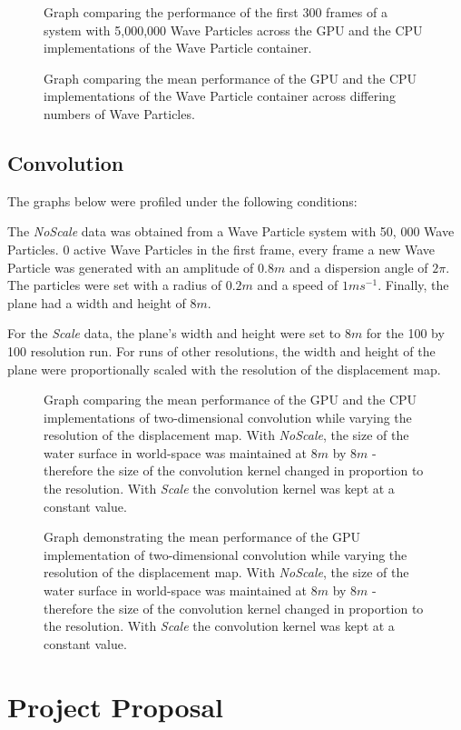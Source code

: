\documentclass[12pt,a4paper,twoside]{report}
\begin{document}
\begin{figure}[H]
\centering

\caption{Graph comparing the performance of the first 300 frames of a system
with 5,000,000 Wave Particles across the GPU and the CPU implementations of the
Wave Particle container.}
\end{figure}

\begin{figure}[H]
\centering

\caption{Graph comparing the mean performance of the GPU and the CPU
implementations of the Wave Particle container across differing numbers of Wave
Particles.}
\end{figure}

\section{Convolution}
\label{app:performance_graphs_convolution}

The graphs below were profiled under the following conditions:

The \textit{NoScale} data was obtained from a Wave Particle system with 50, 000
Wave Particles. $0$ active Wave Particles in the first frame, every frame a new
Wave Particle was generated with an amplitude of $0.8m$ and a dispersion angle
of $2\pi$. The particles were set with a radius of $0.2m$ and a speed of
$1ms^{-1}$. Finally, the plane had a width and height of $8m$.

For the \textit{Scale} data, the plane's width and height were set to $8m$ for
the 100 by 100 resolution run. For runs of other resolutions, the width and
height of the plane were proportionally scaled with the resolution of the
displacement map.

\begin{figure}[H]
\centering

\caption{Graph comparing the mean performance of the GPU and the CPU
implementations of two-dimensional convolution while varying the resolution of
the displacement map. With \textit{NoScale}, the size of the water surface in
world-space was maintained at $8m$ by $8m$ - therefore the size of the
convolution kernel changed in proportion to the resolution. With \textit{Scale}
the convolution kernel was kept at a constant value.}
\end{figure}

\begin{figure}[H]
\centering

\caption{Graph demonstrating the mean performance of the GPU implementation of
two-dimensional convolution while varying the resolution of the displacement
map. With \textit{NoScale}, the size of the water surface in world-space was
maintained at $8m$ by $8m$ - therefore the size of the convolution kernel
changed in proportion to the resolution. With \textit{Scale} the convolution
kernel was kept at a constant value.}
\end{figure}



\chapter{Project Proposal}


\end{document}
